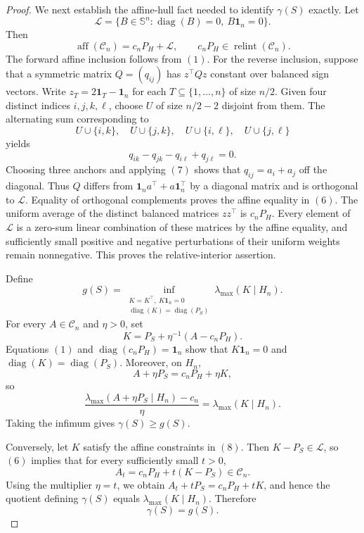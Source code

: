 \documentclass{article}
\begin{document}
\begin{proof}
We next establish the affine-hull fact needed to identify \(\gamma(S)\) exactly. Let
\[
\mathcal L=\{B\in\mathbb S^n:\operatorname{diag}(B)=0,\ B\mathbf1_n=0\}.
\]
Then
\[
\operatorname{aff}(\mathcal C_n)=c_nP_H+\mathcal L,
\qquad
c_nP_H\in\operatorname{relint}(\mathcal C_n).
\tag{6}
\]
The forward affine inclusion follows from \((1)\). For the reverse inclusion, suppose that a symmetric matrix \(Q=(q_{ij})\) has \(z^\top Qz\) constant over balanced sign vectors. Write \(z_T=2\mathbf1_T-\mathbf1_n\) for each \(T\subseteq\{1,\ldots,n\}\) of size \(n/2\). Given four distinct indices \(i,j,k,\ell\), choose \(U\) of size \(n/2-2\) disjoint from them. The alternating sum corresponding to
\[
U\cup\{i,k\},\quad U\cup\{j,k\},\quad
U\cup\{i,\ell\},\quad U\cup\{j,\ell\}
\]
yields
\[
q_{ik}-q_{jk}-q_{i\ell}+q_{j\ell}=0.
\tag{7}
\]
Choosing three anchors and applying \((7)\) shows that \(q_{ij}=a_i+a_j\) off the diagonal. Thus \(Q\) differs from \(\mathbf1_na^\top+a\mathbf1_n^\top\) by a diagonal matrix and is orthogonal to \(\mathcal L\). Equality of orthogonal complements proves the affine equality in \((6)\). The uniform average of the distinct balanced matrices \(zz^\top\) is \(c_nP_H\). Every element of \(\mathcal L\) is a zero-sum linear combination of these matrices by the affine equality, and sufficiently small positive and negative perturbations of their uniform weights remain nonnegative. This proves the relative-interior assertion.

Define
\[
g(S)=\inf_{\substack{K=K^\top,\ K\mathbf1_n=0\\
\operatorname{diag}(K)=\operatorname{diag}(P_S)}}
\lambda_{\max}(K\mid H_n).
\tag{8}
\]
For every \(A\in\mathcal C_n\) and \(\eta>0\), set
\[
K=P_S+\eta^{-1}(A-c_nP_H).
\tag{9}
\]
Equations \((1)\) and \(\operatorname{diag}(c_nP_H)=\mathbf1_n\) show that \(K\mathbf1_n=0\) and \(\operatorname{diag}(K)=\operatorname{diag}(P_S)\). Moreover, on \(H_n\),
\[
A+\eta P_S=c_nP_H+\eta K,
\]
so
\[
\frac{\lambda_{\max}(A+\eta P_S\mid H_n)-c_n}{\eta}
=\lambda_{\max}(K\mid H_n).
\tag{10}
\]
Taking the infimum gives \(\gamma(S)\geq g(S)\).

Conversely, let \(K\) satisfy the affine constraints in \((8)\). Then \(K-P_S\in\mathcal L\), so \((6)\) implies that for every sufficiently small \(t>0\),
\[
A_t=c_nP_H+t(K-P_S)\in\mathcal C_n.
\tag{11}
\]
Using the multiplier \(\eta=t\), we obtain \(A_t+tP_S=c_nP_H+tK\), and hence the quotient defining \(\gamma(S)\) equals \(\lambda_{\max}(K\mid H_n)\). Therefore
\[
\gamma(S)=g(S).
\tag{12}
\]


\end{proof}
\end{document}
